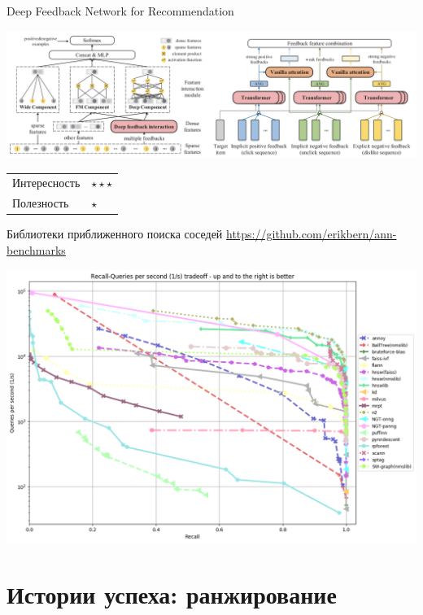 \documentclass[11pt,aspectratio=169]{beamer}
\begin{document}
\begin{frame}{Deep Feedback Network for Recommendation \cite{DFN}}

\begin{center}
\includegraphics[scale=0.3]{images/dfn.png}
\end{center}

\begin{tabular}{l l}
Интересность & $\star\star\star$ \\
Полезность & $\star$
\end{tabular}

\end{frame}

\begin{frame}{Библиотеки приближенного поиска соседей}
\url{https://github.com/erikbern/ann-benchmarks}

\begin{center}
\includegraphics[scale=0.3]{images/ann.png}
\end{center}

\end{frame}

\section{Истории успеха: ранжирование}
\end{document}
